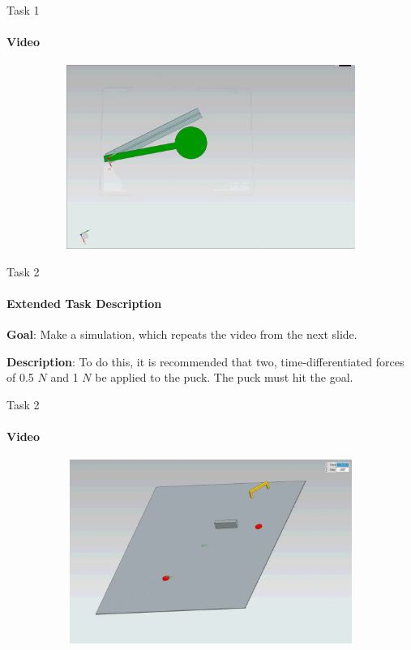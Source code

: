 \documentclass[aspectratio=169]{beamer}
\begin{document}
\begin{frame}[t]{Task 1}
    \framesubtitle{Video}
    \vspace{-0.6cm}
    \begin{figure}[H]
        \href{https://disk.yandex.ru/i/-vrZe2tMoOiVMQ}{
            \centering\includegraphics[height=6cm,width=1\textwidth,keepaspectratio]{1_preview.png}}
        \label{fig:1_preview.png}
    \end{figure}
\end{frame}


\begin{frame}[t]{Task 2}
    \framesubtitle{Extended Task Description}
    \textbf{Goal}: Make a simulation, which repeats the video from the next slide.
    \smallskip

    \textbf{Description}: To do this, it is recommended that two, time-differentiated forces of 0.5 $N$ and 1 $N$ be applied to the puck. The puck must hit the goal.
\end{frame}

\begin{frame}[t]{Task 2}
    \framesubtitle{Video}
    \vspace{-0.6cm}
    \begin{figure}[H]
        \href{https://disk.yandex.ru/i/iwNthKk0RIUtEg}{
            \centering\includegraphics[height=6cm,width=1\textwidth,keepaspectratio]{2_preview.png}}
        \label{fig:2_preview.png}
    \end{figure}
\end{frame}
\end{document}
